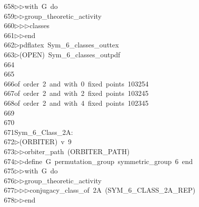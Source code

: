 \begin{tabbing}
658\>$\triangleright$\>$\triangleright$\>with\ G\ do\ \\[0pt]
659\>$\triangleright$\>$\triangleright$\>group\_theoretic\_activity\ \\[0pt]
660\>$\triangleright$\>$\triangleright$\>$\triangleright$\>classes\ \\[0pt]
661\>$\triangleright$\>$\triangleright$\>end\\[0pt]
662\>$\triangleright$\>pdflatex\ Sym\_6\_classes\_outtex\\[0pt]
663\>$\triangleright$\>(OPEN)\ Sym\_6\_classes\_outpdf\\[0pt]
664\>\\[0pt]
665\>\\[0pt]
666\>of\ order\ 2\ and\ with\ 0\ fixed\ points\ 103254\\[0pt]
667\>of\ order\ 2\ and\ with\ 2\ fixed\ points\ 103245\\[0pt]
668\>of\ order\ 2\ and\ with\ 4\ fixed\ points\ 102345\\[0pt]
669\>\\[0pt]
670\>\\[0pt]
671\>Sym\_6\_Class\_2A:\\[0pt]
672\>$\triangleright$\>(ORBITER)\ v\ 9\ \\[0pt]
673\>$\triangleright$\>$\triangleright$\>orbiter\_path\ (ORBITER\_PATH)\ \\[0pt]
674\>$\triangleright$\>$\triangleright$\>define\ G\ permutation\_group\ symmetric\_group\ 6\ end\ \\[0pt]
675\>$\triangleright$\>$\triangleright$\>with\ G\ do\ \\[0pt]
676\>$\triangleright$\>$\triangleright$\>group\_theoretic\_activity\ \\[0pt]
677\>$\triangleright$\>$\triangleright$\>$\triangleright$\>conjugacy\_class\_of\ 2A\ (SYM\_6\_CLASS\_2A\_REP)\ \\[0pt]
678\>$\triangleright$\>$\triangleright$\>end\\[0pt]

\end{tabbing}
